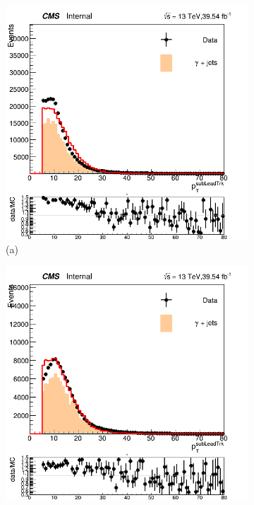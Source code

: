\begin{figure}[!ht]
    \captionsetup[subfigure]{labelformat=empty}
    \vspace*{-0.2cm}
    \centering
    \setlength{\mylength}{\textwidth}
    \begin{subfigure}[t]{0.50\mylength}
        \centering
        \includegraphics[width=0.45\mylength]{resources/plots/Phi3_sublead_pt.png}
        \caption{\footnotesize (a)}
    \end{subfigure}%
    \begin{subfigure}[t]{0.50\mylength}
        \centering
        \includegraphics[width=0.45\mylength]{resources/plots/Omega_sublead_pt.png}

\end{subfigure}
\end{figure}
